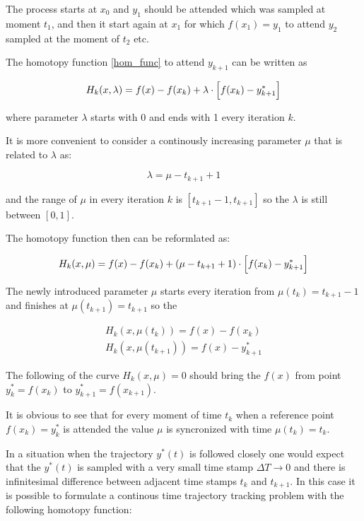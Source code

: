 \documentclass[11pt,american]{article}
\begin{document}
The process starts at $x_0$ and $y_1$ should be attended which was sampled at moment $t_1$, and then it start again at $x_1$ for which $f(x_1)=y_1$ to attend $y_2$ sampled at the moment of $t_2$ etc.
 
The homotopy function \eqref{hom_func} to attend $y_{k+1}$ can be written as

\begin{equation}
H_k(x,\lambda) = f(x) - f(x_k) + \lambda \cdot \Bigl[ f(x_k) - y^*_{k+1} \Bigr] 
\end{equation}

where parameter $\lambda$ starts with 0 and ends with 1 every iteration $k$.

It is more convenient to consider a continously increasing parameter $\mu$ that is related to $\lambda$ as:

\begin{equation}
\lambda = \mu - t_{k+1} + 1
\end{equation}

and the range of $\mu$ in every iteration $k$ is $[t_{k+1} - 1, t_{k+1}]$ so the $\lambda$ is still between $[0,1]$.

The homotopy function then can be reformlated as:

\begin{equation}
H_k(x,\mu) = f(x) - f(x_k) + (\mu - t_{k+1} + 1) \cdot \Bigl[ f(x_k) - y^*_{k+1} \Bigr] 
\end{equation}

The newly introduced parameter $\mu$ starts every iteration from $\mu(t_k) = t_{k+1} - 1$ and finishes at $\mu(t_{k+1}) = t_{k+1}$ so the

\begin{gather}
H_k(x,\mu(t_k)) = f(x) - f(x_k) \\
H_k(x,\mu(t_{k+1})) = f(x) - y^*_{k+1}
\end{gather}

The following of the curve $H_k(x,\mu) = 0$ should bring the $f(x)$ from point $y^*_k = f(x_k)$ to $y^*_{k+1} = f(x_{k+1})$.

It is obvious to see that for every moment of time $t_k$ when a reference point $f(x_k) = y^*_k$ is attended the value $\mu$ is syncronized with time $\mu(t_k) = t_k$.

In a situation when the trajectory $y^*(t)$ is followed closely one would expect that the $y^*(t)$ is sampled with a very small time stamp $\Delta T \to 0$ and there is infinitesimal difference between adjacent time stamps $t_k$ and $t_{k+1}$. In this case it is possible to formulate a continous time trajectory tracking problem with the following homotopy function:
\end{document}
